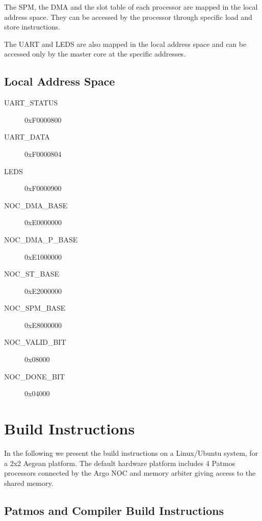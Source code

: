 \documentclass[a4paper,fontsize=10pt,twoside,DIV15,BCOR12mm,headinclude=true,footinclude=false,pagesize,bibtotoc]{scrbook}
\begin{document}
The SPM, the DMA and the slot table of each processor are mapped in the local address space.
They can be accessed by the processor through specific load and store instructions.

The UART and LEDS are also mapped in the local address space and can be accessed only by the master core
at the specific addresses.

\subsection{Local Address Space}

\begin{description}
\item[UART\_STATUS]      0xF0000800
\item[UART\_DATA]        0xF0000804
\item[LEDS]              0xF0000900
\item[NOC\_DMA\_BASE]    0xE0000000
\item[NOC\_DMA\_P\_BASE] 0xE1000000
\item[NOC\_ST\_BASE]     0xE2000000
\item[NOC\_SPM\_BASE]    0xE8000000
\item[NOC\_VALID\_BIT]   0x08000
\item[NOC\_DONE\_BIT]    0x04000
\end{description}


\section{Build Instructions}

In the following we present the build instructions on a Linux/Ubuntu system,
for a 2x2 Aegean platform. The default hardware platform includes 4 Patmos processors 
connected by the Argo NOC and memory arbiter giving access to the shared memory.


\subsection{Patmos and Compiler Build Instructions}
\end{document}
